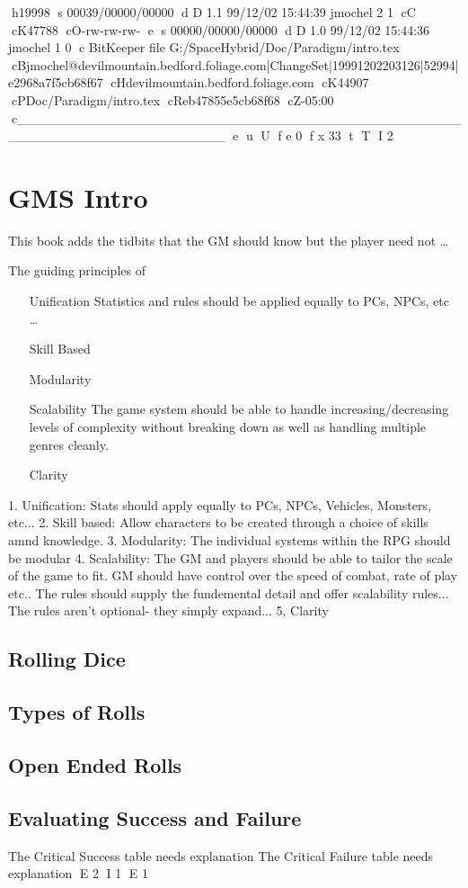 h19998
s 00039/00000/00000
d D 1.1 99/12/02 15:44:39 jmochel 2 1
cC
cK47788
cO-rw-rw-rw-
e
s 00000/00000/00000
d D 1.0 99/12/02 15:44:36 jmochel 1 0
c BitKeeper file G:/SpaceHybrid/Doc/Paradigm/intro.tex
cBjmochel@devilmountain.bedford.foliage.com|ChangeSet|19991202203126|52994|e2968a7f5cb68f67
cHdevilmountain.bedford.foliage.com
cK44907
cPDoc/Paradigm/intro.tex
cReb47855e5cb68f68
cZ-05:00
c______________________________________________________________________
e
u
U
f e 0
f x 33
t
T
I 2
\chapter{GMS Intro}

This book adds the tidbits that the GM should know but the 
player need not \dots

The guiding principles of \SH\ 

\begin{enumerate}
\item[Unification] Statistics and rules should be applied equally to
PCs, NPCs, etc \dots
\item[Skill Based] 
\item[Modularity]
\item[Scalability] The game system should be able to handle 
increasing/decreasing levels of complexity without breaking down
as well as handling multiple genres cleanly.
\item[Clarity]
\end{enumerate}

1. Unification: Stats should apply equally to PCs, NPCs, Vehicles, Monsters, etc...
2. Skill based: Allow characters to be created through a choice of skills amnd
knowledge.
3. Modularity: The individual systems within the RPG should be modular
4. Scalability: The GM and players should be able to tailor the scale
of the game to fit. GM should have control over the speed of combat,
rate of play etc.. The rules should supply the fundemental detail
and offer scalability rules... The rules aren't optional- they simply
expand...
5, Clarity

\section{Rolling Dice}

\section{Types of Rolls}

\section{Open Ended Rolls}

\section{Evaluating Success and Failure}

The Critical Success table needs explanation
The Critical Failure table needs explanation
E 2
I 1
E 1
